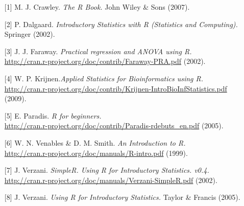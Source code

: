 \begin{enumerate}

\item[{[1]}] M. J. Crawley. \textsl{The R Book.} John Wiley \& Sons (2007).

\item[{[2]}] P. Dalgaard. \textsl{Introductory Statistics with R (Statistics and Computing).} Springer (2002).

\item[{[3]}] J. J. Faraway. \textsl{Practical regression and ANOVA using R.}\\ \url{http://cran.r-project.org/doc/contrib/Faraway-PRA.pdf} (2002). 

\item[{[4]}] W. P. Krijnen.\textsl{Applied Statistics for Bioinformatics using R.}\\ \url{http://cran.r-project.org/doc/contrib/Krijnen-IntroBioInfStatistics.pdf} (2009). 

\item[{[5]}] E. Paradis. \textsl{R for beginners.}\\  \url{http://cran.r-project.org/doc/contrib/Paradis-rdebuts\_en.pdf} (2005). 

\item[{[6]}] W. N. Venables \& D. M. Smith. \textsl{An Introduction to R.}\\  \url{http://cran.r-project.org/doc/manuals/R-intro.pdf} (1999). 

\item[{[7]}] J. Verzani. \textsl{SimpleR. Using R for Introductory Statistics. v0.4.}\\ \url{http://cran.r-project.org/doc/manuals/Verzani-SimpleR.pdf} (2002). 

\item[{[8]}] J. Verzani. \textsl{Using R for Introductory Statistics.} Taylor \& Francis (2005).

\end{enumerate}



%
\backmatter
%
%
%
\cleardoublepage
%
 \printindex
%   
%
%
%
\cleardoublepage






